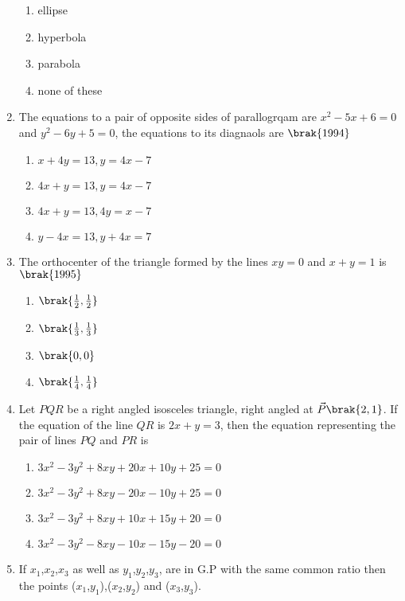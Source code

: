 \begin{enumerate}[label=\thesubsection.\arabic*.,ref=\thesubsection.\theenumi]
\begin{multicols}{2}
\begin{enumerate}
       \item ellipse
       \item hyperbola
       \item parabola
       \item none of these
\end{enumerate}
\end{multicols}
\item The equations to a pair of opposite sides of parallogrqam are $x^2-5x+6=0$ and $y^2-6y+5=0$, the equations to its diagnaols are 
\hfill{$\brak{1994}$}
\begin{multicols}{2}
\begin{enumerate}
      \item $x+4y=13,y=4x-7$
    \item $4x+y=13,y=4x-7$
      \item $4x+y=13,4y=x-7$
        \item $y-4x=13,y+4x=7$
\end{enumerate}
\end{multicols}
\item The orthocenter of the triangle formed by the lines $xy=0$ and $x+y=1$ is 
\hfill{$\brak{1995}$}
\begin{multicols}{4}
\begin{enumerate}
      \item $\brak{\frac{1}{2},\frac{1}{2}}$
      \item $\brak{\frac{1}{3},\frac{1}{3}}$
      \item $\brak{0,0}$
      \item $\brak{\frac{1}{4},\frac{1}{4}}$
\end{enumerate}
\end{multicols}
\item Let $PQR$ be a right angled isosceles triangle, right angled at $\vec{P}\brak{2,1}$. If the equation of the line $QR$ is $2x+y=3$, then the equation representing the pair of lines $PQ$ and $PR$ is
\hfill {}
\begin{multicols}{2}
\begin{enumerate}
    \item $3x^2-3y^2+8xy+20x+10y+25=0$
    \item $3x^2-3y^2+8xy-20x-10y+25=0$
    \item $3x^2-3y^2+8xy+10x+15y+20=0$
    \item $3x^2-3y^2-8xy-10x-15y-20=0$
\end{enumerate}
\end{multicols}
\item If $x_1$,$x_2$,$x_3$ as well as $y_1$,$y_2$,$y_3$, are in G.P with the same common ratio then the points ($x_1$,$y_1$),($x_2$,$y_2$) and ($x_3$,$y_3$).

\end{enumerate}
